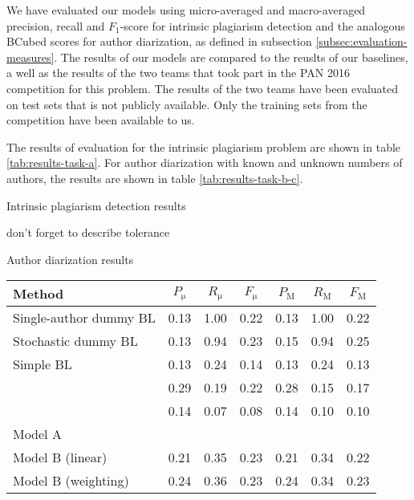 \documentclass[10pt, a4paper]{article}
\begin{document}
We have evaluated our models using micro-averaged and macro-averaged precision, recall and $F_1$-score for intrinsic plagiarism detection and the analogous BCubed scores for author diarization, as defined in subsection \ref{subsec:evaluation-measures}. The results of our models are compared to the reuslts of our baselines, a well as the results of the two teams that took part in the PAN 2016 competition for this problem. The results of the two teams have been evaluated on test sets that is not publicly available. Only the training sets from the competition have been available to us.

The results of evaluation for the intrinsic plagiarism problem are shown in table \ref{tab:results-task-a}. For author diarization with known and unknown numbers of authors, the results are shown in table \ref{tab:results-task-b-c}.

{Intrinsic plagiarism detection results}

don't forget to describe tolerance

{Author diarization results}

\begin{table*}
	\caption{Results on the intrinsic plagiarism detection task.}
	\label{tab:results-task-a}
	\begin{center}
		\begin{tabular}{l|ccc|ccc}
			\toprule
			Method & $P_\mathrm{\mu}$ & $R_\mathrm{\mu}$ & $F_\mathrm{\mu}$ & $P_\mathrm{M}$ & $R_\mathrm{M}$ & $F_\mathrm{M}$\\
			\midrule
			Single-author dummy BL 	& 0.13 & 1.00 & 0.22 & 0.13 & 1.00 & 0.22 \\
			Stochastic dummy BL 	& 0.13 & 0.94 & 0.23 & 0.15 & 0.94 & 0.25 \\
			Simple BL 				& 0.13 & 0.24 & 0.14 & 0.13 & 0.24 & 0.13 \\
			\midrule
			\citet{kuznetsov-2016} 	& 0.29 & 0.19 & 0.22 & 0.28 & 0.15 & 0.17 \\
			\citet{sittar-2016} 	& 0.14 & 0.07 & 0.08 & 0.14 & 0.10 & 0.10 \\
			\midrule			
			Model A 				&  &  &  &  &  & \\			
			Model B (linear) 		& 0.21 & 0.35 & 0.23 & 0.21 & 0.34 & 0.22 \\
			Model B (weighting) 	& 0.24 & 0.36 & 0.23 & 0.24 & 0.34 & 0.23 \\
			\bottomrule
		\end{tabular}
	\end{center}
\end{table*}
\end{document}
